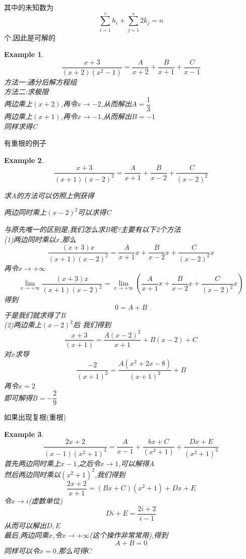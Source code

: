 \documentclass[11pt,hyperref,a4paper,UTF8]{ctexart}
\newtheorem{example}{Example}[subsection]
\begin{document}
\begin{CJK}{UTF8}{gkai}
其中的未知数为\[\sum_{i = 1}^r h_i+ \sum_{j = 1}^s 2k_j =n\]个,因此是可解的\\

\begin{example}
  \[\dfrac{x+3}{(x + 2 )(x^2 - 1 )} = \dfrac{A}{x + 2}+\dfrac{B}{x + 1}+\dfrac{C}{x -1}\]
  方法一:通分后解方程组\\

  方法二:求极限\\
  两边乘上$(x + 2)$,再令$x \to -2$,从而解出$A = \dfrac{1}{3}$\\
  两边乘上$(x + 1)$,再令$x \to -1$,从而解出$B = -1$\\
  同样求得C
\end{example}
有重根的例子
\begin{example}
  \[\dfrac{x + 3}{(x + 1) (x - 2)^2} = \dfrac{A}{x + 1} + \dfrac{B}{x-2} + \dfrac{C}{(x-2)^2}\]

求A的方法可以仿照上例获得

两边同时乘上$(x-2)^2$可以求得C

与原先唯一的区别是,我们怎么求B呢?主要有以下2个方法\\

(1)两边同时乘以$x$,那么
\[\dfrac{(x + 3)x}{(x + 1) (x - 2)^2}=\dfrac{A}{x + 1}x + \dfrac{B}{x-2}x + \dfrac{C}{(x-2)^2}x\]
再令$x\to +\infty$
\[\lim_{x\to +\infty}\dfrac{(x + 3)x}{(x + 1) (x - 2)^2}=\lim_{x\to +\infty}\left(\dfrac{A}{x + 1}x + \dfrac{B}{x-2}x + \dfrac{C}{(x-2)^2}x\right)\]
得到
\[ 0 = A + B \]
于是我们就求得了B\\

(2)两边乘上$(x-2)^2$后
我们得到
\[\dfrac{x + 3}{(x + 1)} = \dfrac{A(x - 2)^2}{x + 1} + B(x-2) + C\]
对$x$求导
\[\dfrac{-2}{(x + 1)^2} = \dfrac{A(x^2 + 2x -8)}{(x + 1)^2} + B \]
再令$x = 2$\\
即可解得$B = -\dfrac{2}{9}$
\end{example}
如果出现复根(重根)
\begin{example}
\[\dfrac{2x+2}{(x-1)(x^2 + 1)^2} = \dfrac{A}{x-1} + \dfrac{bx + C}{(x^2 + 1)} +  \dfrac{Dx + E}{(x^2 + 1 )^2} \]
首先两边同时乘上$x-1$,之后令$x\to 1$,可以解得$A$\\

然后两边同时乘以$(x^2 + 1)^2$,我们得到
\[\dfrac{2x+2}{x+1} = (Bx + C)(x^2 + 1) + Dx + E\]
令$x\to i$(虚数单位)\\
\[Di + E = \dfrac{2i + 2}{i - 1}\]
从而可以解出$D,E$\\

最后,两边同乘$x$,令$x\to + \infty$(这个操作非常常用),得到\\
\[A+B = 0\]
同样可以令$x = 0$,那么可得$C$\\
\end{example}

\end{CJK}
\end{document}
